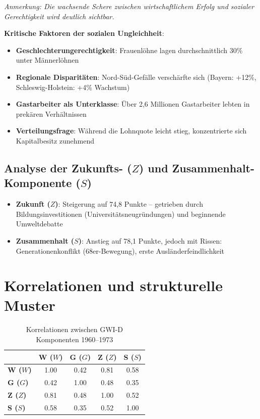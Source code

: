 \begin{flushleft}
\footnotesize{\textit{Anmerkung: Die wachsende Schere zwischen wirtschaftlichem Erfolg und sozialer Gerechtigkeit wird deutlich sichtbar.}}
\end{flushleft}

\textbf{Kritische Faktoren der sozialen Ungleichheit}:

\begin{itemize}
    \item \textbf{Geschlechterungerechtigkeit}: Frauenlöhne lagen durchschnittlich 30\% unter Männerlöhnen
    \item \textbf{Regionale Disparitäten}: Nord-Süd-Gefälle verschärfte sich (Bayern: +12\%, Schleswig-Holstein: +4\% Wachstum)
    \item \textbf{Gastarbeiter als Unterklasse}: Über 2,6 Millionen Gastarbeiter lebten in prekären Verhältnissen
    \item \textbf{Verteilungsfrage}: Während die Lohnquote leicht stieg, konzentrierte sich Kapitalbesitz zunehmend
\end{itemize}

\subsection{Analyse der Zukunfts- (\(Z\)) und Zusammenhalt-Komponente (\(S\))}

\begin{itemize}
    \item \textbf{Zukunft (\(Z\))}: Steigerung auf 74,8 Punkte – getrieben durch Bildungsinvestitionen (Universitätsneugründungen) und beginnende Umweltdebatte
    \item \textbf{Zusammenhalt (\(S\))}: Anstieg auf 78,1 Punkte, jedoch mit Rissen: Generationenkonflikt (68er-Bewegung), erste Ausländerfeindlichkeit
\end{itemize}

\section{Korrelationen und strukturelle Muster}

\begin{table}[ht]
    \centering
    \caption{Korrelationen zwischen GWI-D Komponenten 1960–1973}
    \label{tab:korrelation_wirtschaftswunder}
    \begin{tabular}{lcccc}
        \toprule
        & \textbf{W (\(W\))} & \textbf{G (\(G\))} & \textbf{Z (\(Z\))} & \textbf{S (\(S\))} \\
        \midrule
        \textbf{W (\(W\))} & 1.00 & 0.42 & 0.81 & 0.58 \\
        \textbf{G (\(G\))} & 0.42 & 1.00 & 0.48 & 0.35 \\
        \textbf{Z (\(Z\))} & 0.81 & 0.48 & 1.00 & 0.52 \\
        \textbf{S (\(S\))} & 0.58 & 0.35 & 0.52 & 1.00 \\
        \bottomrule
    \end{tabular}
\end{table}

